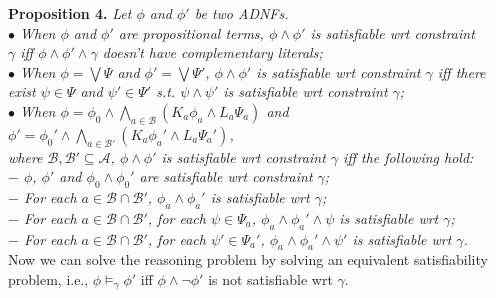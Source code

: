 \documentclass{llncs}
\begin{document}
\textbf{Proposition 4.} \textit{Let $\phi$ and $\phi'$ be two ADNFs. \\
\hspace*{0.1in}$\bullet$ When $\phi$ and $\phi'$ are propositional terms, $\phi\land\phi'$ is satisfiable wrt constraint \\
\hspace*{0.1in}\hspace{0.1in} $\gamma$ iff $\phi\land\phi'\land\gamma$ doesn't have complementary literals; \\
\hspace*{0.1in}$\bullet$ When $\phi=\bigvee\Psi$ and $\phi'=\bigvee\Psi'$, $\phi\land\phi'$ is satisfiable wrt constraint $\gamma$ iff there\\
\hspace*{0.1in}\hspace{0.1in} exist $\psi\in\Psi$ and $\psi'\in\Psi'$ s.t. $\psi\land\psi'$ is satisfiable wrt constraint $\gamma$;\\
\hspace*{0.1in}$\bullet$ When $\phi=\phi_0\land\bigwedge_{a\in\mathcal{B}}(K_a\phi_a\land L_a\Psi_a)$ and $\phi'=\phi_0'\land\bigwedge_{a\in\mathcal{B}'}(K_a\phi_a'\land L_a\Psi_a')$, \\
\hspace*{0.1in}\hspace{0.1in} where $\mathcal{B},\mathcal{B}'\subseteq\mathcal{A}$, $\phi\land\phi'$ is satisfiable wrt constraint $\gamma$ iff the following hold:\\
\hspace*{0.1in}\quad $-$ $\phi$, $\phi'$ and $\phi_0\land\phi_0'$ are satisfiable wrt constraint $\gamma$;\\
\hspace*{0.1in}\quad $-$ For each $a\in\mathcal{B}\cap\mathcal{B}'$, $\phi_a\land\phi_a'$ is satisfiable wrt $\gamma$;\\
\hspace*{0.1in}\quad $-$ For each $a\in\mathcal{B}\cap\mathcal{B}'$, for each $\psi\in\Psi_a$, $\phi_a\land\phi_a'\land\psi$ is satisfiable wrt $\gamma$;\\
\hspace*{0.1in}\quad $-$ For each $a\in\mathcal{B}\cap\mathcal{B}'$, for each $\psi'\in\Psi_a'$, $\phi_a\land\phi_a'\land\psi'$ is satisfiable wrt $\gamma$.}\vspace{0.05in}\\
Now we can solve the reasoning problem by solving an equivalent satisfiability problem, i.e., $\phi\models_\gamma\phi'$ iff $\phi\land\lnot\phi'$ is not satisfiable wrt $\gamma$.
\end{document}
